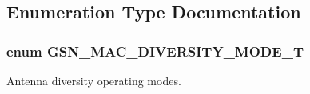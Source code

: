 \subsection{Enumeration Type Documentation}
\hypertarget{a00642_gaabd0b61d3828dd59d93bb8be08f10ac6}{
\subsubsection[{GSN\_\-MAC\_\-DIVERSITY\_\-MODE\_\-T}]{\setlength{\rightskip}{0pt plus 5cm}enum {\bf GSN\_\-MAC\_\-DIVERSITY\_\-MODE\_\-T}}}
\label{a00642_gaabd0b61d3828dd59d93bb8be08f10ac6}


Antenna diversity operating modes. 

